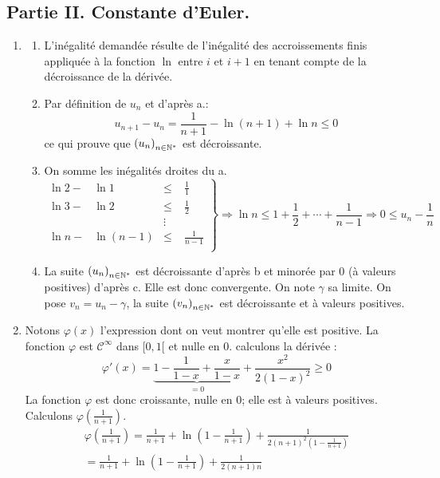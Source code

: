 \subsection*{Partie II. Constante d'Euler.}
\begin{enumerate}
 \item \begin{enumerate}
 \item L'inégalité demandée résulte de l'inégalité des accroissements finis appliquée à la fonction $\ln$ entre $i$ et $i+1$ en tenant compte de la décroissance de la dérivée.  
\item Par définition de $u_n$ et d'après a.:
\begin{displaymath}
 u_{n+1}-u_n=\frac{1}{n+1}-\ln(n+1)+\ln n \leq 0
\end{displaymath}
ce qui prouve que $\left(u_n \right)_{n\in\mathbb{N}^*}$ est décroissante.
\item On somme les inégalités droites du a.
\begin{displaymath}
\left.  \begin{aligned}
  \ln 2 -& \ln 1 &\leq& \;\frac{1}{1}\\
  \ln 3 -& \ln 2 &\leq& \;\frac{1}{2}\\
         &         &\vdots &       \\
  \ln n -& \ln (n-1) &\leq& \;\frac{1}{n-1}\\
 \end{aligned}
\right\rbrace \Rightarrow
\ln n \leq 1+\frac{1}{2}+\cdots+\frac{1}{n-1} \Rightarrow
0\leq u_n - \frac{1}{n}
\end{displaymath}

\item La suite $\left(u_n \right)_{n\in\mathbb{N}^*}$ est décroissante d'après b et minorée par 0 (à valeurs positives) d'après c. Elle est donc convergente. On note $\gamma$ sa limite. On pose $v_n=u_n-\gamma$, la suite $\left(v_n \right)_{n\in\mathbb{N}^*}$ est décroissante et à valeurs positives.
\end{enumerate}

\item Notons $\varphi(x)$ l'expression dont on veut montrer qu'elle est positive. La fonction $\varphi$ est $\mathcal C^\infty$ dans $[0,1[$ et nulle en $0$. calculons la dérivée :
\begin{displaymath}
 \varphi'(x)=\underset{=0}{\underbrace{1-\frac{1}{1-x}+\frac{x}{1-x}}}+\frac{x^2}{2(1-x)^2}\geq 0
\end{displaymath}
La fonction $\varphi$ est donc croissante, nulle en $0$; elle est à valeurs positives.\newline
Calculons $\varphi(\frac{1}{n+1})$.
\begin{multline*}
 \varphi(\frac{1}{n+1})= \frac{1}{n+1} +\ln (1-\frac{1}{n+1})+\frac{1}{2(n+1)^2(1-\frac{1}{n+1})}\\
= \frac{1}{n+1} +\ln (1-\frac{1}{n+1})+\frac{1}{2(n+1)n}
\end{multline*}


\end{enumerate}

